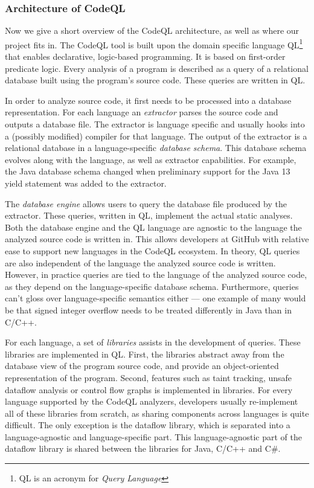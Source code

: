 \subsubsection*{Architecture of CodeQL}
Now we give a short overview of the CodeQL architecture, as well as where our
project fits in. 
The CodeQL tool is built upon the domain specific language QL\footnote{QL is an acronym for \emph{Query Language}}
that enables declarative, logic-based programming.
It is based on first-order predicate logic.
Every analysis of a program is described as a query of a relational database built using 
the program's source code. These queries are written in QL.

In order to analyze source code, it first needs to be processed into a database representation.
For each language an \emph{extractor} parses the source code and outputs a database file.
The extractor is language specific and usually hooks into a (possibly modified) compiler for that language.
The output of the extractor is a relational database in a language-specific \emph{database schema}.
This database schema evolves along with the language, as well as extractor capabilities.
For example, the Java database schema changed when preliminary support for the Java 13 yield statement was
added to the extractor.

The \emph{database engine} allows users to query the database file produced by the extractor.
These queries, written in QL, implement the actual static analyses.
Both the database engine and the QL language are agnostic to the language the analyzed source code 
is written in.
This allows developers at GitHub with relative ease to support new languages in the CodeQL ecosystem.
In theory, QL queries are also independent of the language the analyzed source code is written.
However, in practice queries are tied to the language of the analyzed source code,
as they depend on the language-specific database schema.
Furthermore, queries can't gloss over language-specific semantics either {---} one example of many would be
that signed integer overflow needs to be treated differently in Java than in C/C++.

For each language, a set of \emph{libraries} assists in the development of queries.
These libraries are implemented in QL.
First, the libraries abstract away from the database view of the program source code,
and provide an object-oriented representation of the program.
Second, features such as taint tracking, unsafe dataflow analysis or control flow graphs is implemented in libraries.
For every language supported by the CodeQL analyzers, developers usually re-implement all of these libraries from
scratch, as sharing components across languages is quite difficult.
The only exception is the dataflow library, which is separated into a language-agnostic and 
language-specific part.
This language-agnostic part of the dataflow library is shared between the libraries for Java, C/C++ and C\#.

